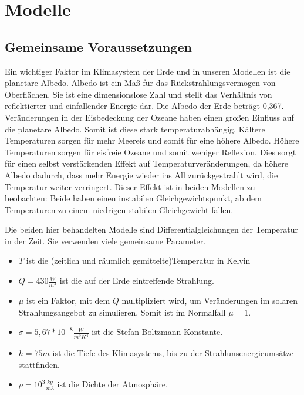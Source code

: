 \documentclass[]{report}
\begin{document}
	
	
	
	
	
	
	
\chapter{Modelle}

\section{Gemeinsame Voraussetzungen}

Ein wichtiger Faktor im Klimasystem der Erde und in unseren Modellen ist die planetare Albedo. Albedo ist ein Maß für das Rückstrahlungsvermögen von Oberflächen. Sie ist eine dimensionslose Zahl und stellt das Verhältnis von reflektierter und einfallender Energie dar. Die Albedo der Erde beträgt 0,367. Veränderungen in der Eisbedeckung der Ozeane haben einen großen Einfluss auf die planetare Albedo. Somit ist diese stark temperaturabhängig. Kältere Temperaturen sorgen für mehr Meereis und somit für eine höhere Albedo. Höhere Temperaturen sorgen für eisfreie Ozeane und somit weniger Reflexion. Dies sorgt für einen selbst verstärkenden Effekt auf Temperaturveränderungen, da höhere Albedo dadurch, dass mehr Energie wieder ins All zurückgestrahlt wird, die Temperatur weiter verringert. Dieser Effekt ist in beiden Modellen zu beobachten: Beide haben einen instabilen Gleichgewichtspunkt, ab dem Temperaturen zu einem niedrigen stabilen Gleichgewicht fallen.\par\bigskip

Die beiden hier behandelten Modelle sind Differentialgleichungen der Temperatur in der Zeit. Sie verwenden viele gemeinsame Parameter.\\

\begin{itemize}
	\item $T$ ist die (zeitlich und räumlich gemittelte)Temperatur in Kelvin
	\item $Q = 430 \frac{W}{m^2}$ ist die auf der Erde eintreffende Strahlung.
	\item $\mu$ ist ein Faktor, mit dem $Q$ multipliziert wird, um Veränderungen im solaren Strahlungsangebot zu simulieren. Somit ist im Normalfall $\mu = 1$.
	\item $\sigma = 5,67*10^{-8} \frac{W}{m^2K^4}$ ist die Stefan-Boltzmann-Konstante.
	\item $h = 75m$ ist die Tiefe des Klimasystems, bis zu der Strahlunsenergieumsätze stattfinden.
	\item $\rho = 10^3 \frac{kg}{m3}$ ist die Dichte der Atmosphäre.
 
\end{itemize}
\end{document}
